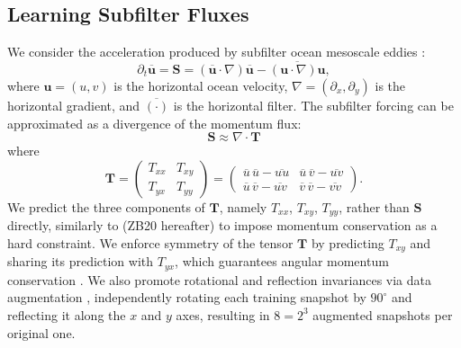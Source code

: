 \documentclass[draft]{agujournal2019}
\providecommand{\DIFadd}[1]{{\protect\color{blue}\uwave{#1}}} %
\providecommand{\DIFaddbegin}{} %
\providecommand{\DIFaddend}{} %
\begin{document}
\subsection{Learning Subfilter Fluxes}
We consider the acceleration produced by subfilter ocean mesoscale eddies \cite<subfilter forcing,>{Bolton2019}:
\begin{equation}
    \partial_t \overline{\mathbf{u}} = \mathbf{S} = (\overline{\mathbf{u}} \cdot \nabla ) \overline{\mathbf{u}} - \overline{(\mathbf{u} \cdot \nabla) \mathbf{u}},  \label{eq:subfilter_forcing}
\end{equation}
where $\mathbf{u}=(u,v)$ is the horizontal ocean  velocity, $\nabla=(\partial_x, \partial_y)$ is the horizontal gradient, and $\overline{(\cdot)}$ is the horizontal filter. The subfilter forcing can be approximated \cite{loose2023comparing} as a divergence of the momentum flux:
\begin{equation}
    \mathbf{S} \approx \nabla \cdot \mathbf{T} \label{eq:momentum_div}
\end{equation}
where
\begin{equation}
    \mathbf{T} = \begin{pmatrix}
        T_{xx} & T_{xy} \\
        T_{yx} & T_{yy}
    \end{pmatrix} = \begin{pmatrix}
        \overline{u}  \, \overline{u} - \overline{u u} & \overline{u} \, \overline{v} - \overline{uv} \\
        \overline{u} \, \overline{v} - \overline{uv} & 
        \overline{v}  \, \overline{v} - \overline{v v}
    \end{pmatrix}. \label{eq:momentum_flux}
\end{equation}
We predict the three components of $ \mathbf{T}$, namely   $T_{xx}$, $T_{xy}$, $T_{yy}$, rather than $\mathbf{S}$ directly, similarly to  (ZB20 hereafter) to impose momentum conservation as a hard constraint. We enforce symmetry of the tensor $\mathbf{T}$ by predicting $T_{xy}$ and sharing its prediction with $T_{yx}$, which guarantees angular momentum conservation \cite[Section 17.3.3]{griffies2018fundamentals}\DIFaddbegin \DIFadd{, up to machine precision}\DIFaddend . We also promote rotational and reflection invariances via data augmentation \cite{guan2022learning}, independently rotating each training snapshot by $90^\circ$ and reflecting it along the $x$ and $y$ axes, resulting in $8=2^3$ augmented snapshots per original one.
\end{document}

